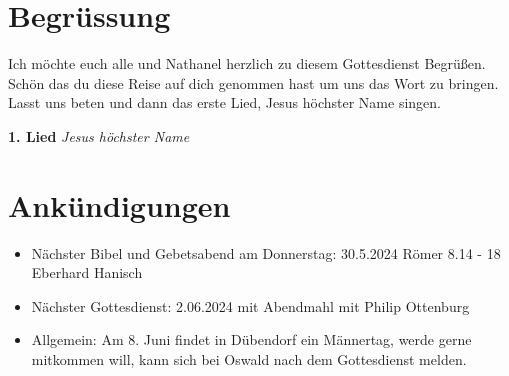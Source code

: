 
\section{Begrüssung}
Ich möchte euch alle und Nathanel herzlich zu diesem Gottesdienst Begrüßen. Schön das du diese Reise auf dich genommen hast um uns das Wort zu bringen. \\Lasst uns beten und dann das erste Lied, Jesus höchster Name singen.

\textbf{1. Lied}
\textit{Jesus höchster Name}

\section{Ankündigungen}
\begin{itemize}
    \item Nächster Bibel und Gebetsabend am Donnerstag: 
30.5.2024 Römer 8.14 - 18 Eberhard Hanisch
    \item Nächster Gottesdienst: 2.06.2024 mit Abendmahl mit Philip Ottenburg
    \item Allgemein: Am 8. Juni findet in Dübendorf ein Männertag, werde gerne mitkommen will, kann
sich bei Oswald nach dem Gottesdienst melden.
\end{itemize}

